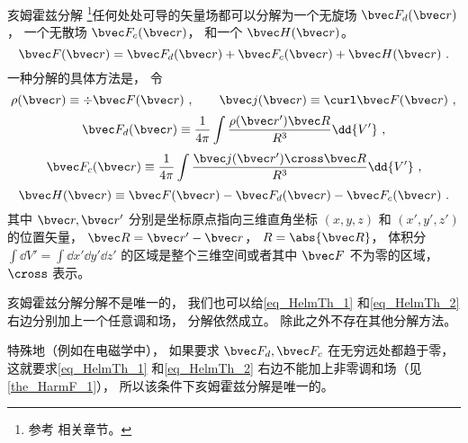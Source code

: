 
\begin{issues}
\issueTODO
\end{issues}


\begin{theorem}{亥姆霍兹分解}
\footnote{参考 \cite{GriffE} 相关章节。}任何处处可导的矢量场都可以分解为一个无旋场 $\bvec F_{d}(\bvec r)$， 一个无散场 $\bvec F_{c}(\bvec r)$， 和一个 $\bvec H(\bvec r)$。
\begin{equation}\label{eq_HelmTh_3}
\bvec F(\bvec r) = \bvec F_{d}(\bvec r) + \bvec F_{c}(\bvec r) + \bvec H(\bvec r)~.
\end{equation}
一种分解的具体方法是， 令
\begin{equation}
\rho(\bvec r) \equiv \div \bvec F(\bvec r) ~,\qquad
\bvec j(\bvec r) \equiv \curl \bvec F(\bvec r)~,
\end{equation}
\begin{equation}\label{eq_HelmTh_1}
\bvec F_{d}(\bvec r) \equiv \frac{1}{4\pi}\int \frac{\rho(\bvec r') \bvec R}{R^3} \dd{V'}~,
\end{equation}
\begin{equation}\label{eq_HelmTh_2}
\bvec F_{c}(\bvec r) \equiv \frac{1}{4\pi}\int \frac{\bvec j(\bvec r')\cross \bvec R}{R^3} \dd{V'}~,
\end{equation}
\begin{equation}\label{eq_HelmTh_4}
\bvec H(\bvec r) \equiv \bvec F(\bvec r) - \bvec F_{d}(\bvec r) - \bvec F_{c}(\bvec r)~.
\end{equation}
其中 $\bvec r, \bvec r'$ 分别是坐标原点指向三维直角坐标 $(x, y, z)$ 和 $(x', y', z')$ 的位置矢量， $\bvec R = \bvec r' - \bvec r$， $R = \abs{\bvec R}$， 体积分 $\int\dd{V'} = \int\dd{x'}\dd{y'}\dd{z'}$ 的区域是整个三维空间或者其中 $\bvec F$ 不为零的区域， $\cross$ 表示。

亥姆霍兹分解分解不是唯一的， 我们也可以给\autoref{eq_HelmTh_1} 和\autoref{eq_HelmTh_2} 右边分别加上一个任意调和场， 分解依然成立。 除此之外不存在其他分解方法。
\end{theorem}

特殊地（例如在电磁学中）， 如果要求 $\bvec F_d, \bvec F_c$ 在无穷远处都趋于零， 这就要求\autoref{eq_HelmTh_1} 和\autoref{eq_HelmTh_2} 右边不能加上非零调和场（见\autoref{the_HarmF_1}）， 所以该条件下亥姆霍兹分解是唯一的。

